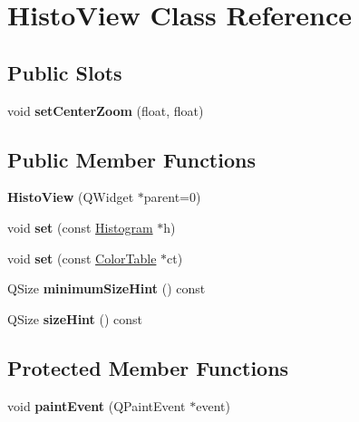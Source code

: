 \hypertarget{classHistoView}{
\section{HistoView Class Reference}
\label{classHistoView}
}
\subsection*{Public Slots}
\begin{DoxyCompactItemize}
\item 
\hypertarget{classHistoView_a3f771b4fe0fc124470345944bf8d2b19}{
void {\bfseries setCenterZoom} (float, float)}
\label{classHistoView_a3f771b4fe0fc124470345944bf8d2b19}

\end{DoxyCompactItemize}
\subsection*{Public Member Functions}
\begin{DoxyCompactItemize}
\item 
\hypertarget{classHistoView_aa1b833f4b0c9130dba36977be19748ad}{
{\bfseries HistoView} (QWidget $\ast$parent=0)}
\label{classHistoView_aa1b833f4b0c9130dba36977be19748ad}

\item 
\hypertarget{classHistoView_a0c7078d091a903f4a721acf261cb0ed3}{
void {\bfseries set} (const \hyperlink{classHistogram}{Histogram} $\ast$h)}
\label{classHistoView_a0c7078d091a903f4a721acf261cb0ed3}

\item 
\hypertarget{classHistoView_ae956f08e5837c5689aefd0df9e875e2d}{
void {\bfseries set} (const \hyperlink{classColorTable}{ColorTable} $\ast$ct)}
\label{classHistoView_ae956f08e5837c5689aefd0df9e875e2d}

\item 
\hypertarget{classHistoView_af5e22dce298b0abc9e2c83ba1738c3c1}{
QSize {\bfseries minimumSizeHint} () const }
\label{classHistoView_af5e22dce298b0abc9e2c83ba1738c3c1}

\item 
\hypertarget{classHistoView_a331abb1544bfaee8c7335951a7f5fd4d}{
QSize {\bfseries sizeHint} () const }
\label{classHistoView_a331abb1544bfaee8c7335951a7f5fd4d}

\end{DoxyCompactItemize}
\subsection*{Protected Member Functions}
\begin{DoxyCompactItemize}
\item 
\hypertarget{classHistoView_a32ab126b8c695b26d304e6044ebe1740}{
void {\bfseries paintEvent} (QPaintEvent $\ast$event)}
\label{classHistoView_a32ab126b8c695b26d304e6044ebe1740}

\end{DoxyCompactItemize}

